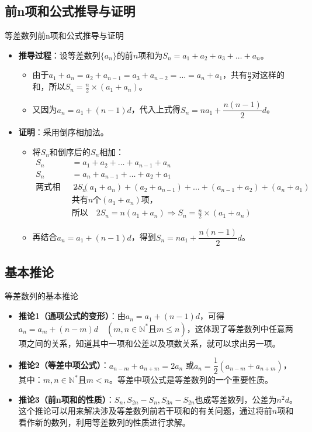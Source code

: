 \documentclass[aspectratio=169]{ctexbeamer} %
\begin{document}
\subsection{前n项和公式推导与证明}
\begin{frame}{等差数列前n项和公式推导与证明}
\begin{itemize}
\item \textbf{推导过程}：设等差数列$\{a_n\}$的前$n$项和为$S_n = a_1 + a_2 + a_3 + \dots + a_n$。
\begin{itemize}
\item 由于$a_1 + a_n = a_2 + a_{n-1} = a_3 + a_{n-2} = \dots = a_n + a_1$，共有$\frac{n}{2}$对这样的和，所以$S_n = \frac{n}{2} \times (a_1 + a_n)$。
\item 又因为$a_n = a_1 + (n - 1)d$，代入上式得$S_n = na_1 + \dfrac{n(n-1)}{2}d$。
\end{itemize}
\item \textbf{证明}：采用倒序相加法。
\begin{itemize}
\item 将$S_n$和倒序后的$S_n$相加：
\begin{align*}
S_n &= a_1 + a_2 + \dots + a_{n-1} + a_n \\
S_n &= a_n + a_{n-1} + \dots + a_2 + a_1 \\
\text{两式相加得}\quad 2 S_n &= (a_1 + a_n) + (a_2 + a_{n-1}) + \dots + (a_{n-1} + a_2) + (a_n + a_1) \\
&\text{共有$n$个$(a_1 + a_n)$项，} \\
&\text{所以}\quad 2 S_n = n (a_1 + a_n) \Rightarrow S_n = \frac{n}{2} \times (a_1 + a_n)
\end{align*}
\item 再结合$a_n = a_1 + (n - 1)d$，得到$S_n = na_1 + \dfrac{n(n-1)}{2} d$。
\end{itemize}
\end{itemize}
\end{frame}

\subsection{基本推论}
\begin{frame}{等差数列的基本推论}
\begin{itemize}
\item \textbf{推论1（通项公式的变形）}：由$a_n = a_1 + (n - 1)d$，可得$a_n = a_m + (n - m)d\quad(m, n \in \mathbb{N}^* \text{且} m \leq n)$，这体现了等差数列中任意两项之间的关系，知道其中一项和公差以及项数关系，就可以求出另一项。
\item \textbf{推论2（等差中项公式）}：$a_{n-m} + a_{n+m} = 2a_n$ 或$a_n = \dfrac{1}{2}(a_{n-m} + a_{n+m})$，其中：$m, n \in \mathbb{N}^* \text{且} m < n$。等差中项公式是等差数列的一个重要性质。
\item \textbf{推论3（前n项和的性质）}：$S_n, S_{2n} - S_n, S_{3n} - S_{2n}$也成等差数列，公差为$n^2 d$。这个推论可以用来解决涉及等差数列前若干项和的有关问题，通过将前$n$项和看作新的数列，利用等差数列的性质进行求解。
\end{itemize}
\end{frame}
\end{document}
